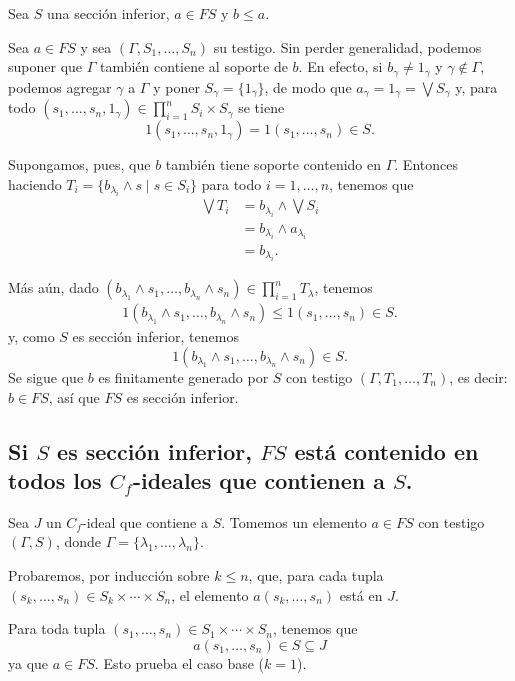 \documentclass[12pt,letterpaper,titlepage]{article}
\theoremstyle{definition}
\newcommand\Sup{\bigvee}
\renewcommand\inf{\wedge}
\newcommand\tps[1]{\texorpdfstring{#1}{}}
\newcommand\<{\langle}
\renewcommand\>{\rangle}
\begin{document}
Sea $S$ una sección inferior, $a\in FS$ y $b\leq a$.

Sea $a\in FS$ y sea $(\Gamma,S_1,\dots,S_n)$ su testigo.
Sin perder generalidad, podemos suponer que $\Gamma$ también
contiene al soporte de $b$.
En efecto, si $b_\gamma\neq 1_\gamma$ y $\gamma\not\in\Gamma$,
podemos agregar $\gamma$ a $\Gamma$ y poner
$S_\gamma = \{1_\gamma\}$,
de modo que $a_\gamma = 1_\gamma = \Sup S_\gamma$
y, para todo
$(s_1,\dots,s_n,1_\gamma)\in\prod_{i=1}^nS_i\times S_\gamma$
se tiene
\[
  1(s_1,\dots,s_n,1_\gamma) = 1(s_1,\dots,s_n) \in S
.\]

Supongamos, pues, que $b$ también tiene soporte contenido en
$\Gamma$.
Entonces haciendo $T_i=\{b_{\lambda_i}\inf s \mid s\in S_i\}$
para todo $i=1,\dots,n$, tenemos que
\begin{align*}
  \Sup T_i
  &= b_{\lambda_i}\inf\Sup S_i \\
  &= b_{\lambda_i}\inf a_{\lambda_i} \\
  &= b_{\lambda_i}.
\end{align*}

Más aún, dado $(b_{\lambda_1}\inf s_1,\dots,b_{\lambda_n}\inf
s_n)\in \prod_{i=1}^n T_\lambda$, tenemos
\begin{align*}
  1(b_{\lambda_1}\inf s_1,\dots,b_{\lambda_n}\inf s_n)
  \leq 1(s_1,\dots,s_n) \in S.
\end{align*}
y, como $S$ es sección inferior, tenemos
\[
  1(b_{\lambda_1}\inf s_1,\dots,b_{\lambda_n}\inf s_n) \in S
.\]
Se sigue que $b$ es finitamente generado por $S$ con testigo
$(\Gamma,T_1,\dots,T_n)$, es decir: $b\in FS$,
así que $FS$ es sección inferior.

\subsection{Si \tps{$S$} es sección inferior, \tps{$FS$} está contenido en
todos los \tps{$C_f$}-ideales que contienen a \tps{$S$}.}

Sea $J$ un $C_f$-ideal que contiene a $S$.
Tomemos un elemento $a\in FS$ con testigo $(\Gamma,S)$, donde
$\Gamma=\{\lambda_1,\dots,\lambda_n\}$.

Probaremos, por inducción sobre $k\leq n$, que, para cada tupla
$(s_k,\dots,s_n)\in S_k\times\cdots\times S_n$, el elemento
$a(s_k,\dots,s_n)$ está en $J$.

Para toda tupla
$(s_1,\dots,s_n)\in S_1\times\cdots\times S_n$, tenemos que
\[
  a(s_1,\dots,s_n)\in S\subseteq J
\]
ya que $a\in FS$.
Esto prueba el caso base ($k=1$).
\end{document}
